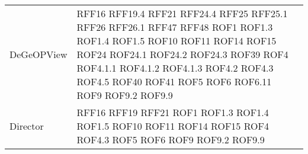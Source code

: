 \begin{longtable}{p{5cm}!{\VRule[1pt]}p{2.5cm}}
	DeGeOPView & RFF16 \newline RFF19.4 \newline RFF21 \newline RFF24.4 \newline RFF25 \newline RFF25.1 \newline RFF26 \newline RFF26.1 \newline RFF47 \newline RFF48 \newline ROF1 \newline ROF1.3 \newline ROF1.4 \newline ROF1.5 \newline ROF10 \newline ROF11 \newline ROF14 \newline ROF15 \newline ROF24 \newline ROF24.1 \newline ROF24.2 \newline ROF24.3 \newline ROF39 \newline ROF4 \newline ROF4.1.1 \newline ROF4.1.2 \newline ROF4.1.3 \newline ROF4.2 \newline ROF4.3 \newline ROF4.5 \newline ROF40 \newline ROF41 \newline ROF5 \newline ROF6 \newline ROF6.11 \newline ROF9 \newline ROF9.2 \newline ROF9.9\\
	Director & RFF16 \newline RFF19 \newline RFF21 \newline ROF1 \newline ROF1.3 \newline ROF1.4 \newline ROF1.5 \newline ROF10 \newline ROF11 \newline ROF14 \newline ROF15 \newline ROF4 \newline ROF4.3 \newline ROF5 \newline ROF6 \newline ROF9 \newline ROF9.2 \newline ROF9.9\\

\end{longtable}
